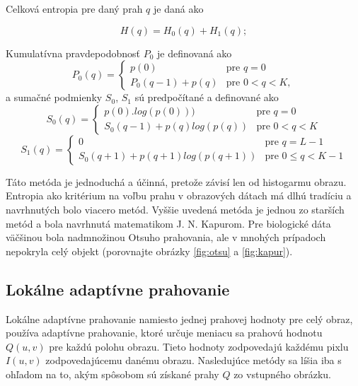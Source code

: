 \documentclass[a4paper,11pt,oneside]{article}%
\begin{document}
 
Celková entropia pre daný prah $q$ je daná ako

\begin{equation}
H(q) =  H_0(q) + H_1(q);
\end{equation}  
 
Kumulatívna pravdepodobnosť $P_0$ je definovaná ako
\begin{equation}
	P_0(q) = \begin{cases} p(0) & \text{pre } q = 0 \\
                            P_0(q-1) + p(q)         & \text{pre } 0 < q < K ,     %
        \end{cases}
 \end{equation} 
a sumačné podmienky $S_0$, $S_1$ sú predpočítané a definované ako
 \begin{equation}   
    S_0(q) = \begin{cases} p(0).log(p(0))) & \text{pre } q = 0 \\
                            S_0(q-1) + p(q)log(p(q))         & \text{pre } 0 < q < K      
        \end{cases}
        \end{equation}
\begin{equation}
	S_1(q) = \begin{cases} 0 & \text{pre } q = L-1 \\
                            S_0(q+1) + p(q+1)log(p(q+1))         & \text{pre } 0 \leq q < K -1      %
        \end{cases}       	 
\end{equation}

Táto metóda je jednoduchá a účinná, pretože závisí len od histogarmu obrazu. %
Entropia ako kritérium na voľbu prahu v obrazových dátach má dlhú tradíciu a navrhnutých bolo viacero metód. Vyššie uvedená metóda je jednou zo starších metód a bola navrhnutá  matematikom J. N. Kapurom.
Pre biologické dáta väčšinou bola nadmnožinou Otsuho prahovania, ale v mnohých prípadoch nepokryla celý objekt (porovnajte obrázky   \ref{fig:otsu}  a   \ref{fig:kapur}). 

\subsection{Lokálne adaptívne prahovanie}

Lokálne adaptívne prahovanie namiesto jednej prahovej hodnoty pre celý obraz, používa adaptívne prahovanie, ktoré určuje meniacu sa prahovú hodnotu $Q(u,v)$ pre každú polohu obrazu. Tieto hodnoty zodpovedajú každému pixlu $I(u,v)$ zodpovedajúcemu danému obrazu. Nasledujúce metódy sa líšia iba s ohľadom na to, akým spôsobom sú získané prahy $Q$ zo vstupného obrázku. 
\end{document}
